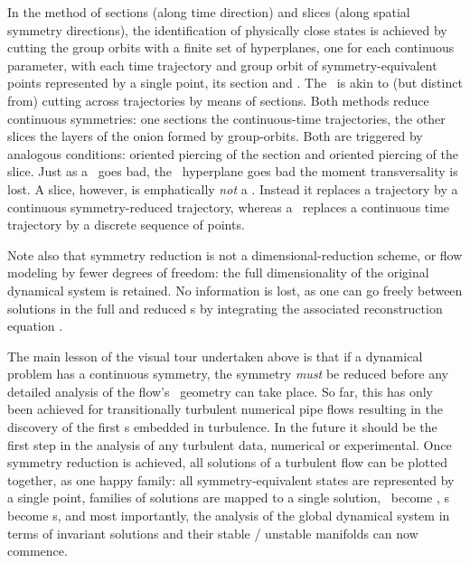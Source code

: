 \documentclass[aip,cha,reprint,
secnumarabic,
nofootinbib, tightenlines,
nobibnotes, showkeys, showpacs,
groupedaddress
]{revtex4-1}
\begin{document}
In the method of sections (along time direction) and slices (along
spatial symmetry directions), the identification of physically close
states is achieved by cutting the group orbits with a finite set of
hyperplanes, one for each continuous parameter, with each time trajectory
and group orbit of symmetry-equivalent points represented by a single
point, its  section and \slice. The \mslices\ is akin to (but distinct
from) cutting across trajectories by means of sections. Both methods
reduce continuous symmetries: one sections the continuous-time
trajectories, the other slices the layers of the onion formed by
group-orbits. Both are triggered by analogous conditions: oriented piercing of
the section and oriented piercing of the slice. Just as a \PoincSec\ goes
bad, the \slice\ hyperplane goes bad the moment transversality is lost. A
slice, however, is emphatically \emph{not} a \PoincSec. Instead it
replaces a trajectory by a continuous symmetry-reduced trajectory,
whereas a \PoincSec\ replaces a continuous time trajectory by a discrete
sequence of points.

Note also that symmetry reduction is not a dimensional-reduction scheme,
or flow modeling by fewer degrees of freedom: the full dimensionality of
the original dynamical system is retained. No information is lost, as
one can go freely between solutions in the full and reduced \statesp s by
integrating the associated {reconstruction equation} .

The main lesson of the visual tour undertaken above is that if a
dynamical problem has a continuous symmetry, the symmetry \emph{must} be
reduced before any detailed analysis of the flow's \statesp\ geometry can
take place. So far, this has only been achieved for transitionally
turbulent numerical pipe flows resulting in the discovery of
the first \rpo s embedded in turbulence. In the future it should be the
first step in the analysis of any turbulent data, numerical or
experimental. Once symmetry reduction is achieved, all
solutions of a turbulent flow can be plotted together, as one happy
family: all symmetry-equivalent states are represented by a single point,
families of solutions are mapped to a single solution, \reqva\ become
\eqva, \rpo s become \po s, and most importantly, the analysis of the
global dynamical system in terms of invariant solutions and their stable
/ unstable manifolds can now commence.
\end{document}
